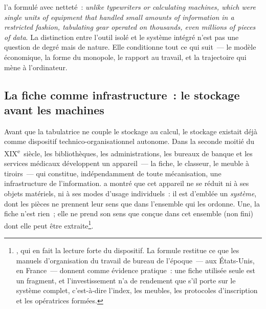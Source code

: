 \textcite{cortada_before_1993} l'a formulé avec netteté~: \og \emph{unlike typewriters or calculating machines, which were single units of equipment that handled small amounts of information in a restricted fashion, tabulating gear operated on thousands, even millions of pieces of data}\fg{}. La distinction entre l'outil isolé et le système intégré n'est pas une question de degré mais de nature. Elle conditionne tout ce qui suit~--- le modèle économique, la forme du monopole, le rapport au travail, et la trajectoire qui mène à l'ordinateur.


\subsection{La fiche comme infrastructure~: le stockage avant les machines}\label{subsec:fiche_infrastructure}

Avant que la tabulatrice ne couple le stockage au calcul, le stockage existait déjà comme dispositif technico-organisationnel autonome. Dans la seconde moitié du XIX\textsuperscript{e}~siècle, les bibliothèques, les administrations, les bureaux de banque et les services médicaux développent un appareil~--- la fiche, le classeur, le meuble à tiroirs~--- qui constitue, indépendamment de toute mécanisation, une infrastructure de l'information. \textcite{gardey_ecrire_2008} a montré que cet appareil ne se réduit ni à ses objets matériels, ni à ses modes d'usage individuels~: il est d'emblée un \emph{système}, dont les pièces ne prennent leur sens que dans l'ensemble qui les ordonne. \og Une, la fiche n'est rien~; elle ne prend son sens que conçue dans cet ensemble (non fini) dont elle peut être extraite\fg{}\footnote{\textcite[ch.~4]{gardey_ecrire_2008}, qui en fait la \og lecture forte\fg{} du dispositif. La formule restitue ce que les manuels d'organisation du travail de bureau de l'époque~--- \textcite{leffingwell_office_1926} aux États-Unis, \textcite{bolle_utilisation_1929} en France~--- donnent comme évidence pratique~: une fiche utilisée seule est un fragment, et l'investissement n'a de rendement que s'il porte sur le système complet, c'est-à-dire l'index, les meubles, les protocoles d'inscription et les opératrices formées.}.

